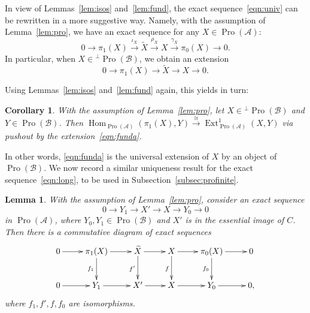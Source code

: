 \documentclass[11pt]{article}
\newtheorem{lemm}[theo]{Lemma}
\newtheorem{coro}[theo]{Corollary}
\theoremstyle{definition}
\numberwithin{equation}{section}
\newcommand\cA{{\mathcal A}}
\newcommand\cB{{\mathcal B}}
\newcommand\tX{{\widetilde X}}
\DeclareMathOperator{\Ext}{Ext}
\DeclareMathOperator{\Hom}{Hom}
\DeclareMathOperator{\Pro}{Pro}
\theoremstyle{remark}
\begin{document}
In view of Lemmas~\ref{lem:isos} and~\ref{lem:fund}, the exact sequence~\eqref{eqn:univ} can be rewritten in a more suggestive way. Namely, with the assumption of Lemma~\ref{lem:pro}, we have an exact sequence for any $X \in \Pro(\cA)$:
\begin{equation}\label{eqn:long}
0 \longrightarrow \pi_1(X)
\stackrel{\iota_X}{\longrightarrow} \tX
\stackrel{\rho_X}{\longrightarrow} X
\stackrel{\gamma_X}{\longrightarrow} \pi_0(X)
\longrightarrow 0.
\end{equation}
In particular, when $X \in {^{\perp}\Pro(\cB)}$, we obtain an extension
\begin{equation}\label{eqn:funda}
0 \longrightarrow \pi_1(X)
\longrightarrow \tX \longrightarrow X
\longrightarrow 0.
\end{equation}

Using Lemmas~\ref{lem:isos} and~\ref{lem:fund} again, this yields in turn:

\begin{coro}\label{cor:sc}
With the assumption of Lemma~\ref{lem:pro}, let $X \in {^{\perp}\Pro(\cB)}$ and $Y \in \Pro(\cB)$. Then $\Hom_{\Pro(\cA)}(\pi_1(X),Y)
\stackrel{\cong}{\to} \Ext^1_{\Pro(\cA)}(X,Y)$ via pushout by the extension~\eqref{eqn:funda}.
\end{coro}

In other words, \eqref{eqn:funda} is the universal extension of $X$ by an object of $\Pro(\cB)$. We now record a similar uniqueness result for the exact sequence~\eqref{eqn:long}, to be used in Subsection~\ref{subsec:profinite}.

\begin{lemm}\label{lem:unique}
With the assumption of Lemma~\ref{lem:pro}, consider an exact sequence
\begin{equation}\label{eqn:unique}
0 \longrightarrow Y_1 \longrightarrow X' \longrightarrow X \longrightarrow Y_0 \longrightarrow 0
\end{equation}
in $\Pro(\cA)$, where $Y_0,Y_1 \in \Pro(\cB)$ and $X'$ is in the essential image of $C$. Then there is a commutative diagram of exact sequences
\[
\xymatrix{ 0 \ar[r] & \pi_1(X) \ar[r] \ar[d]_{f_1} & \tX \ar[r] \ar[d]_{f'} & X \ar[r] \ar[d]_{f} & \pi_0(X) \ar[r] \ar[d]_{f_0} & 0 \\
0 \ar[r] & Y_1 \ar[r] & X' \ar[r] & X \ar[r] & Y_0 \ar[r] & 0, \\
}
\]
where $f_1,f',f,f_0$ are isomorphisms.
\end{lemm}
\end{document}
